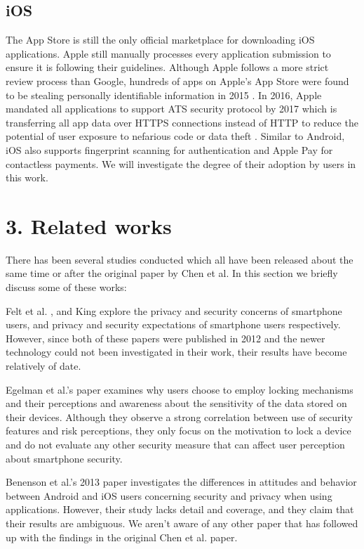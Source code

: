 \documentclass{sigchi}
\begin{document}
\subsection{iOS}
The App Store is still the only official marketplace for downloading iOS applications. Apple still manually processes every application submission to ensure it is following their guidelines. Although Apple follows a more strict review process than Google, hundreds of apps on Apple's  App Store were found to be stealing personally identifiable information in 2015 \cite{brown}. In 2016, Apple mandated all applications to support ATS security protocol by 2017 which is transferring all app data over HTTPS connections instead of HTTP to reduce the potential of user exposure to nefarious code or data theft \cite{ats}. Similar to Android, iOS also supports fingerprint scanning for authentication and Apple Pay for contactless payments. We will investigate the degree of their adoption by users in this work.

\section{3. Related works}
There has been several studies conducted which all have been released about the same time or after the original paper by Chen et al. In this section we briefly discuss some of these works:

Felt et al. \cite{felt2012ve}, and King \cite{king2012come} explore the privacy and security concerns of smartphone users, and privacy and security expectations of smartphone users respectively. However, since both of these papers were published in 2012 and the newer technology could not been investigated in their work, their results have become relatively of date. 

Egelman et al.'s paper \cite{egelman2014you} examines why users choose to employ locking mechanisms and their perceptions and awareness about the sensitivity of the data stored on their devices. Although they observe a strong correlation between use of security features and risk perceptions, they only focus on the motivation to lock a device and do not evaluate any other security measure that can affect user perception about smartphone security. 

Benenson et al.'s 2013 paper \cite{benenson2013android} investigates the differences in attitudes and behavior between Android and iOS users concerning security and privacy when using applications. However, their study lacks detail and coverage, and they claim that their results are ambiguous. We aren't aware of any other paper that has followed up with the findings in the original Chen et al. paper.
\end{document}
